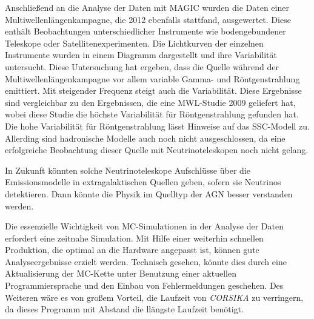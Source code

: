 Anschließend an die Analyse der Daten mit MAGIC wurden die Daten einer Multiwellenlängenkampagne, die 2012 ebenfalls stattfand, ausgewertet.
Diese enthält Beobachtungen unterschiedlicher Instrumente wie bodengebundener Teleskope oder Satellitenexperimenten.
Die Lichtkurven der einzelnen Instrumente wurden in einem Diagramm dargestellt und ihre Variabilität untersucht.
Diese Untersuchung hat ergeben, dass die Quelle während der Multiwellenlängenkampagne vor allem variable Gamma- und Röntgenstrahlung emittiert.
Mit steigender Frequenz steigt auch die Variabilität.
Diese Ergebnisse sind vergleichbar zu den Ergebnissen, die eine MWL-Studie 2009 geliefert hat, wobei diese Studie die höchste Variabilität für Röntgenstrahlung gefunden hat.
Die hohe Variabilität für Röntgenstrahlung lässt Hinweise auf das SSC-Modell zu.
Allerding sind hadronische Modelle auch noch nicht ausgeschlossen, da eine erfolgreiche Beobachtung dieser Quelle mit Neutrinoteleskopen noch nicht gelang.

In Zukunft könnten solche Neutrinoteleskope Aufschlüsse über die Emissionsmodelle in extragalaktischen Quellen geben, sofern sie Neutrinos detektieren.
Dann könnte die Physik im Quelltyp der AGN besser verstanden werden.

Die essenzielle Wichtigkeit von MC-Simulationen in der Analyse der Daten erfordert eine zeitnahe Simulation.
Mit Hilfe einer weiterhin schnellen Produktion, die optimal an die Hardware angepasst ist, können gute Analyseergebnisse erzielt werden.
Technisch gesehen, könnte dies durch eine Aktualisierung der MC-Kette unter Benutzung einer aktuellen Programmiersprache und den Einbau von Fehlermeldungen geschehen.
Des Weiteren wäre es von großem Vorteil, die Laufzeit von \textit{CORSIKA} zu verringern, da dieses Programm mit Abstand die llängste Laufzeit benötigt.